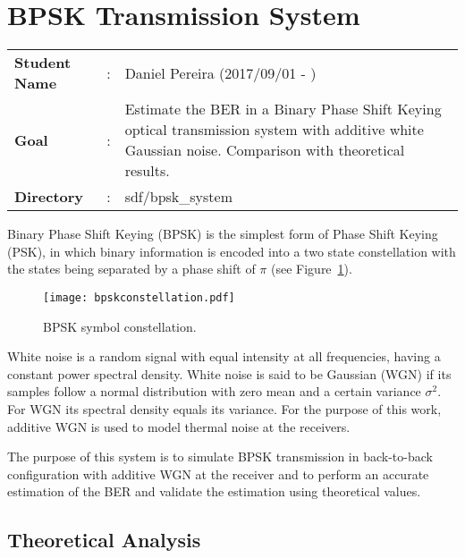 \clearpage
\section{BPSK Transmission System}

\begin{tcolorbox}	
\begin{tabular}{p{2.75cm} p{0.2cm} p{10.5cm}} 	
\textbf{Student Name}  &:& Daniel Pereira (2017/09/01 - )\\
\textbf{Goal}          &:& Estimate the BER in a Binary Phase Shift Keying optical transmission system with additive white Gaussian noise. Comparison with theoretical results.\\
\textbf{Directory}              &:& sdf/bpsk\_system  
\end{tabular}
\end{tcolorbox}

Binary Phase Shift Keying (BPSK) is the simplest form of Phase Shift Keying (PSK), in which binary information is encoded into a two state constellation with the states being separated by a phase shift of $\pi$ (see Figure~\ref{fig:BPSKConst}).

\begin{figure}[h]
\centering
\texttt{[image: bpskconstellation.pdf]}
\caption{BPSK symbol constellation.}
\label{fig:BPSKConst}
\end{figure}

\par
White noise is a random signal with equal intensity at all frequencies, having a constant power spectral density. White noise is said to be Gaussian (WGN) if its samples follow a normal distribution with zero mean and a certain variance $\sigma^2$. For WGN its spectral density equals its variance. For the purpose of this work, additive WGN is used to model thermal noise at the receivers.
\par
The purpose of this system is to simulate BPSK transmission in back-to-back configuration with additive WGN at the receiver and to perform an accurate estimation of the BER and validate the estimation using theoretical values.

\subsection{Theoretical Analysis}

